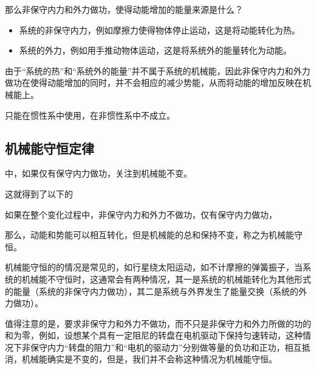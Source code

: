 那么非保守内力和外力做功，使得动能增加的能量来源是什么？
\begin{itemize}
    \item 系统的非保守内力，例如摩擦力使得物体停止运动，这是将动能转化为热。
    \item 系统的外力，例如用手推动物体运动，这是将系统外的能量转化为动能。
\end{itemize}
由于“系统的热”和“系统外的能量”并不属于系统的机械能，因此非保守内力和外力做功在使得动能增加的同时，并不会相应的减少势能，从而将动能的增加反映在机械能上。

只能在惯性系中使用，在非惯性系中不成立。

\subsection{机械能守恒定律}
中，如果仅有保守内力做功，关注到机械能不变。

这就得到了以下的
\begin{BoxPrinciple}[机械能守恒定律]
    \centering\small
    如果在整个变化过程中，非保守内力和外力不做功，仅有保守内力做功，
    
    那么，动能和势能可以相互转化，但是机械能的总和保持不变，称之为机械能守恒。
\end{BoxPrinciple}
机械能守恒的的情况是常见的，如行星绕太阳运动，如不计摩擦的弹簧振子，当系统的机械能不守恒时，这通常会有两种情况，其一是系统的机械能转化为其他形式的能量（系统的非保守内力做功），其二是系统与外界发生了能量交换（系统的外力做功）。

值得注意的是，要求非保守力和外力不做功，而不只是非保守力和外力所做的功的和为零，例如，设想某个具有一定阻尼的转盘在电机驱动下保持匀速转动，这种情况下非保守内力“转盘的阻力”和“电机的驱动力”分别做等量的负功和正功，相互抵消，机械能确实是不变的，但是，我们并不会称这种情况为机械能守恒。

